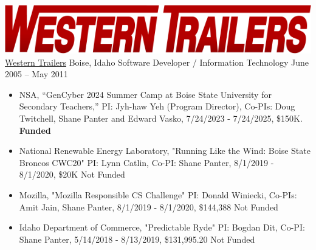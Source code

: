 \documentclass{shanep}
\begin{document}
\begin{itemize}
   \ressubheading
       {\includegraphics[scale=.1]{wt.png}}
       {{\href{http://westerntrailer.com}{Western Trailers}}}
       {Boise, Idaho}
       {Software Developer / Information Technology}
       {June 2005 -- May 2011}
       { \footnotesize
         \begin{itemize}
         \end{itemize}
       }

\end{itemize}

\pagebreak

\printbibliography[heading=none]


\begin{itemize}
  \item{NSA, “GenCyber 2024 Summer Camp at Boise State University for Secondary Teachers,” PI:
    Jyh-haw Yeh (Program Director), Co-PIs: Doug Twitchell, Shane Panter and Edward Vasko, 7/24/2023
    - 7/24/2025, \$150K. \textbf{Funded}}
  \item{National Renewable Energy Laboratory, "Running Like the Wind: Boise State Broncos CWC20" PI:
    Lynn Catlin, Co-PI: Shane Panter, 8/1/2019 - 8/1/2020, \$20K Not Funded}
  \item{Mozilla, "Mozilla Responsible CS Challenge" PI: Donald Winiecki, Co-PIs: Amit Jain, Shane
    Panter, 8/1/2019 - 8/1/2020, \$144,388 Not Funded}
  \item{Idaho Department of Commerce, "Predictable Ryde" PI: Bogdan Dit, Co-PI: Shane Panter,
    5/14/2018 - 8/13/2019, \$131,995.20 Not Funded}
\end{itemize}
\end{document}
